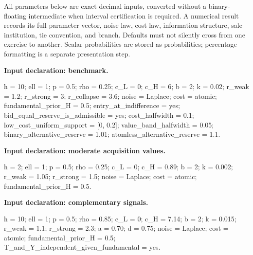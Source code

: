 \documentclass[
  11pt,
]{article}
\newenvironment{Shaded}{}{}
\newcommand{\NormalTok}[1]{#1}
\begin{document}
All parameters below are exact decimal inputs, converted without a
binary-floating intermediate when interval certification is required. A
numerical result records its full parameter vector, noise law, cost law,
information structure, sale institution, tie convention, and branch.
Defaults must not silently cross from one exercise to another. Scalar
probabilities are stored as probabilities; percentage formatting is a
separate presentation step.


\textbf{Input declaration: benchmark.}

\begin{Shaded}
\begin{Highlighting}[]
\NormalTok{h = 10; ell = 1; p = 0.5; rho = 0.25;}
\NormalTok{c\_L = 0; c\_H = 6; b = 2; k = 0.02;}
\NormalTok{r\_weak = 1.2; r\_strong = 3; r\_collapse = 3.6;}
\NormalTok{noise = Laplace; cost = atomic; fundamental\_prior\_H = 0.5;}
\NormalTok{entry\_at\_indifference = yes; bid\_equal\_reserve\_is\_admissible = yes;}
\NormalTok{cost\_halfwidth = 0.1; low\_cost\_uniform\_support = [0, 0.2];}
\NormalTok{value\_band\_halfwidth = 0.05;}
\NormalTok{binary\_alternative\_reserve = 1.01; atomless\_alternative\_reserve = 1.1.}
\end{Highlighting}
\end{Shaded}


\textbf{Input declaration: moderate acquisition values.}

\begin{Shaded}
\begin{Highlighting}[]
\NormalTok{h = 2; ell = 1; p = 0.5; rho = 0.25;}
\NormalTok{c\_L = 0; c\_H = 0.89; b = 2; k = 0.002;}
\NormalTok{r\_weak = 1.05; r\_strong = 1.5;}
\NormalTok{noise = Laplace; cost = atomic; fundamental\_prior\_H = 0.5.}
\end{Highlighting}
\end{Shaded}


\textbf{Input declaration: complementary signals.}

\begin{Shaded}
\begin{Highlighting}[]
\NormalTok{h = 10; ell = 1; p = 0.5; rho = 0.85;}
\NormalTok{c\_L = 0; c\_H = 7.14; b = 2; k = 0.015;}
\NormalTok{r\_weak = 1.1; r\_strong = 2.3; a = 0.70; d = 0.75;}
\NormalTok{noise = Laplace; cost = atomic; fundamental\_prior\_H = 0.5;}
\NormalTok{T\_and\_Y\_independent\_given\_fundamental = yes.}
\end{Highlighting}
\end{Shaded}
\end{document}
